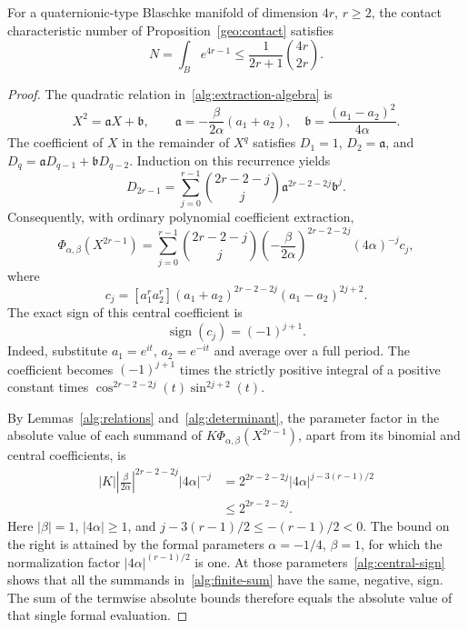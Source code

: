 \begin{theorem}
\label{alg:upper}
For a quaternionic-type Blaschke manifold of dimension $4r$, $r\ge2$,
the contact characteristic number of Proposition~\ref{geo:contact}
satisfies
\begin{equation}
 N=\int_{B}e^{4r-1}
 \le \frac1{2r+1}\binom{4r}{2r}.
 \label{alg:sharp-upper}
\end{equation}
\end{theorem}

\begin{proof}
The quadratic relation in~\eqref{alg:extraction-algebra} is
\[
 X^2=\mathfrak a X+\mathfrak b,\qquad
 \mathfrak a=-\frac{\beta}{2\alpha}(a_1+a_2),\quad
 \mathfrak b=\frac{(a_1-a_2)^2}{4\alpha}.
\]
The coefficient of $X$ in the remainder of $X^q$ satisfies
$D_1=1$, $D_2=\mathfrak a$, and $D_q=\mathfrak a D_{q-1}+\mathfrak b D_{q-2}$.
Induction on this recurrence yields
\[
 D_{2r-1}=
 \sum_{j=0}^{r-1}\binom{2r-2-j}{j}\mathfrak a^{2r-2-2j}\mathfrak b^j.
\]
Consequently, with ordinary polynomial coefficient extraction,
\begin{equation}
 \Phi_{\alpha,\beta}(X^{2r-1})
 =\sum_{j=0}^{r-1}\binom{2r-2-j}{j}
   \left(-\frac{\beta}{2\alpha}\right)^{2r-2-2j}
   (4\alpha)^{-j}c_j,
 \label{alg:finite-sum}
\end{equation}
where
\[
 c_j=[a_1^ra_2^r]
       (a_1+a_2)^{2r-2-2j}(a_1-a_2)^{2j+2}.
\]
The exact sign of this central coefficient is
\begin{equation}
 \operatorname{sign}(c_j)=(-1)^{j+1}.
 \label{alg:central-sign}
\end{equation}
Indeed, substitute $a_1=e^{it}$, $a_2=e^{-it}$ and average over a full
period.  The coefficient becomes $(-1)^{j+1}$ times the strictly positive
integral of a positive constant times
$\cos^{2r-2-2j}(t)\sin^{2j+2}(t)$.

By Lemmas~\ref{alg:relations} and~\ref{alg:determinant}, the parameter
factor in the absolute value of each summand of
$K\Phi_{\alpha,\beta}(X^{2r-1})$, apart from its binomial and central
coefficients, is
\begin{align*}
 |K|\left|\frac{\beta}{2\alpha}\right|^{2r-2-2j}
       |4\alpha|^{-j}
 &=2^{2r-2-2j}|4\alpha|^{j-3(r-1)/2}\\
 &\le 2^{2r-2-2j}.
\end{align*}
Here $|\beta|=1$, $|4\alpha|\ge1$, and
$j-3(r-1)/2\le-(r-1)/2<0$.
The bound on the right is attained by the formal parameters
$\alpha=-1/4$, $\beta=1$, for which the normalization factor
$|4\alpha|^{(r-1)/2}$ is one.
At those parameters~\eqref{alg:central-sign} shows that all the summands
in~\eqref{alg:finite-sum} have the same, negative, sign.  The sum of
the termwise absolute bounds therefore equals the absolute value of
that single formal evaluation.


\end{proof}
